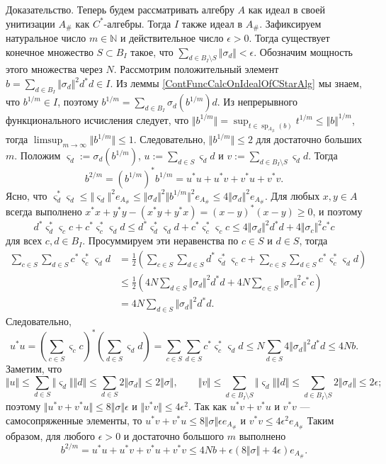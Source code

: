 \documentclass[12pt]{article}
\numberwithin{equation}{subsection}
\theoremstyle{plain}
\newenvironment{proof}{Доказательство.}{}
\begin{document}
\begin{fulltext}
\begin{proof}
Теперь будем рассматривать алгебру $A$ как идеал в своей унитизации $A_\#$ как $C^*$-алгебры. Тогда $I$ также идеал в $A_\#$. Зафиксируем натуральное число $m\in\mathbb{N}$ и действительное число $\epsilon>0$. Тогда существует конечное множество $S\subset B_I$ такое, что $\sum_{d\in B_I\setminus S}\Vert\sigma_d\Vert<\epsilon$. Обозначим мощность этого множества через $N$. Рассмотрим положительный элемент $b=\sum_{d\in B_I}\Vert\sigma_d\Vert^2 d^*d\in I$. Из леммы \ref{ContFuncCalcOnIdealOfCStarAlg} мы знаем, что $b^{1/m}\in I$, поэтому $b^{1/m}=\sum_{d\in B_I}\sigma_d(b^{1/m})d$. Из непрерывного функционального исчисления следует, что $\Vert b^{1/m}\Vert=\sup_{t\in\operatorname{sp}_{A_\#}(b)} t^{1/m}\leq\Vert b\Vert^{1/m}$, тогда $\limsup_{m\to\infty}\Vert b^{1/m}\Vert\leq 1$. Следовательно, $\Vert b^{1/m}\Vert\leq 2$ для достаточно больших $m$. Положим $\varsigma_d:=\sigma_d(b^{1/m})$, $u:=\sum_{d\in S}\varsigma_d d$ и $v:=\sum_{d\in B_I\setminus S}\varsigma_d d$. Тогда 
$$
b^{2/m}=(b^{1/m})^*b^{1/m}=u^*u+u^*v+v^*u+v^*v.
$$
Ясно, что $\varsigma_d^*\varsigma_d\leq \Vert \varsigma_d\Vert^2 e_{A_\#}\leq \Vert \sigma_d\Vert^2\Vert b^{1/m}\Vert^2 e_{A_\#}\leq 4\Vert \sigma_d\Vert^2 e_{A_\#}$. Для любых $x,y\in A$ всегда выполнено $x^*x+y^*y-(x^*y+y^*x)=(x-y)^*(x-y)\geq 0$, и поэтому 
$$
d^*\varsigma_d^* \varsigma_c c+c^*\varsigma_c^* \varsigma_d d
\leq d^*\varsigma_d^*\varsigma_d d + c^*\varsigma_c^*\varsigma_c c
\leq 4\Vert \sigma_d\Vert^2 d^*d+4\Vert \sigma_c\Vert^2 c^*c
$$
для всех $c,d\in B_I$. Просуммируем эти неравенства по $c\in S$ и $d\in S$, тогда
$$
\begin{aligned}
\sum_{c\in S}\sum_{d\in S}c^*\varsigma_c^* \varsigma_d d
&=\frac{1}{2}\left(\sum_{c\in S}\sum_{d\in S}d^*\varsigma_d^* \varsigma_c c+\sum_{c\in S}\sum_{d\in S}c^*\varsigma_c^* \varsigma_d d\right)\\
&\leq\frac{1}{2}\left(4 N\sum_{d\in S} \Vert \sigma_d\Vert^2 d^*d+
4 N\sum_{c\in S} \Vert \sigma_c\Vert^2 c^*c\right)\\
&=4 N\sum_{d\in S} \Vert \sigma_d\Vert^2 d^*d.
\end{aligned}
$$
Следовательно,
$$
u^*u
=\left(\sum_{c\in S}\varsigma_c c\right)^*\left(\sum_{d\in S}\varsigma_d d\right)
=\sum_{c\in S}\sum_{d\in S}c^*\varsigma_c^* \varsigma_d d
\leq N\sum_{d\in S} 4\Vert \sigma_d\Vert^2 d^*d
\leq 4N b.
$$
Заметим, что
$$
\Vert u\Vert
\leq \sum_{d\in S}\Vert\varsigma_d\Vert\Vert d\Vert
\leq \sum_{d\in S}2\Vert\sigma_d\Vert
\leq 2\Vert\sigma\Vert,
\qquad
\Vert v\Vert
\leq \sum_{d\in B_I\setminus S}\Vert\varsigma_d\Vert\Vert d\Vert
\leq \sum_{d\in B_I\setminus S}2\Vert\sigma_d\Vert
\leq 2\epsilon;
$$
поэтому $\Vert u^*v+v^*u\Vert\leq 8\Vert\sigma\Vert\epsilon$ и $\Vert v^*v\Vert\leq 4\epsilon^2$. Так как $u^*v+v^*u$ и $v^*v$ ---  самосопряженные элементы, то $u^*v+v^*u\leq 8\Vert\sigma\Vert\epsilon e_{A_\#}$ и $v^*v\leq 4\epsilon^2 e_{A_\#}$
Таким образом, для любого $\epsilon>0$ и достаточно большого $m$ выполнено 
$$
b^{2/m}
=u^*u+u^*v+v^*u+v^*v
\leq 4Nb+\epsilon(8\Vert\sigma\Vert+4\epsilon)e_{A_\#}.
$$


\end{proof}
\end{fulltext}
\end{document}
